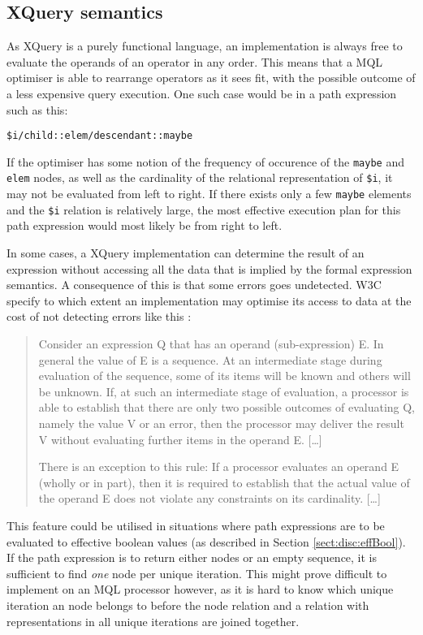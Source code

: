\subsection{XQuery semantics}

As XQuery is a purely functional language, an implementation is always free to
evaluate the operands of an operator in any order\cite{w3c00}. This means that a MQL optimiser is able to rearrange operators as it sees fit, with the
possible outcome of a less expensive query execution. One such case would be in a path expression such as this:
\begin{center}
\texttt{\$i/child::elem/descendant::maybe}
\end{center}
If the optimiser has some notion of the frequency of occurence of the \texttt{maybe} and \texttt{elem} nodes,
as well as the cardinality of the relational representation of \texttt{\$i}, it may not be evaluated from left to
right. If there exists only a few \texttt{maybe} elements and the \texttt{\$i} relation is relatively large, the
most effective execution plan for this path expression would most likely be from right to left.

In some cases, a XQuery implementation can determine the result of an expression without accessing all the data
that is implied by the formal expression semantics. A consequence of this is that some errors goes undetected. W3C
specify to which extent an implementation may optimise its access to data at the cost of not detecting errors
like this \cite{w3c00}:

\begin{quote}
Consider an expression Q that has an operand (sub-expression) E. In general the value of E is a sequence. At an
intermediate stage during evaluation of the sequence, some of its items will be known and others will be unknown.
If, at such an intermediate stage of evaluation, a processor is able to establish that there are only two possible
outcomes of evaluating Q, namely the value V or an error, then the processor may deliver the result V without
evaluating further items in the operand E. [\ldots]

There is an exception to this rule: If a processor evaluates an operand E (wholly or in part), then it is required
to establish that the actual value of the operand E does not violate any constraints on its cardinality. [\ldots] 
\end{quote}

This feature could be utilised in situations where path expressions are to be
evaluated to effective boolean values (as described in Section \ref{sect:disc:effBool}). If the path expression is
to return either nodes or an empty sequence, it is sufficient to find \emph{one} node per unique iteration. This
might prove difficult to implement on an MQL processor however, as it is hard to know which unique iteration an
node belongs to before the node relation and a relation with representations in all unique iterations are
joined together.

